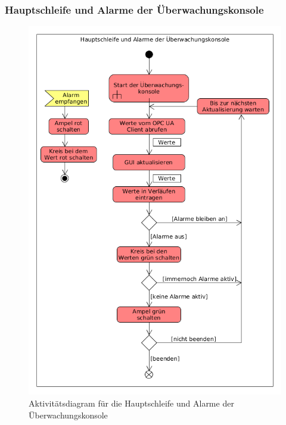 \documentclass[parskip=full]{scrartcl}
\begin{document}
\subsubsection{Hauptschleife und Alarme der Überwachungskonsole}
\begin{figure}[H]
  \centering
  \includegraphics[scale=0.62]{media/Activities/main-console.png}
  \caption{Aktivitätsdiagram für die Hauptschleife und Alarme der Überwachungskonsole}
\end{figure}
\end{document}
